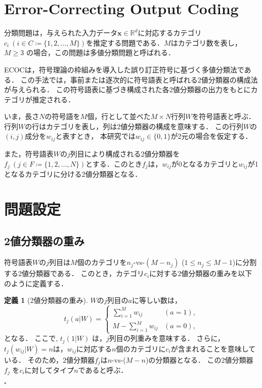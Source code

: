 \documentclass{jarticle}
\theoremstyle{definition}
\newtheorem{definition}{定義}
\def\QED{\hfill$\square$}
\begin{document}
\section{Error-Correcting Output Coding}
分類問題は，与えられた入力データ$\bm{x} \in \mathbb{R}^d$に対応するカテゴリ$c_i\ (i \in C \coloneqq \{1,2,\ldots,M\})$を推定する問題である．$M$はカテゴリ数を表し，$M \ge 3$ の場合，この問題は多値分類問題と呼ばれる．

ECOCは，符号理論の枠組みを導入した誤り訂正符号に基づく多値分類法\cite{Dietterich1994-mt}である．
この手法では，事前\cite{Rifkin2004-sk,Dietterich1994-mt,Escalera2010-pa}または逐次的\cite{Rocha2014-ey}に符号語表と呼ばれる2値分類器の構成法が与えられる．
この符号語表に基づき構成された各2値分類器の出力をもとにカテゴリが推定される．

いま，長さ$N$の符号語を$M$個，行として並べた$M\times N$行列$W$を符号語表と呼ぶ．
行列$W$の行はカテゴリを表し，列は2値分類器の構成を意味する．
この行列$W$の$ (i,j) $成分を$w_{ij}$と表すとき，
本研究では$w_{ij} \in \{0,1\}$が2元の場合を仮定する．

また，符号語表$W$の$j$列目により構成される2値分類器を$f_j\ (j \in F \coloneqq \{1,2,\ldots,N\})$とする．このとき$f_j$は，$w_{ij}$が0となるカテゴリと$w_{ij}$が1となるカテゴリに分ける2値分類器となる．

\section{問題設定}
\subsection{2値分類器の重み}
符号語表$W$の$j$列目は$M$個のカテゴリを$n_j$-vs-$(M-n_j)$ ($1\leq n_j\leq M - 1$)に分割する2値分類器である．
このとき，カテゴリ$c_i$に対する2値分類器の重みを以下のように定義する．
\begin{definition}[2値分類器の重み]\label{def:cate_weight}
$W$の$j$列目の$a$に等しい数は，
 \begin{equation}\label{eq:cate_weight}
    t_{j}(a|W) =\begin{cases}
    \sum_{i = 1}^M w_{ij}&(a = 1),\\
    M - \sum_{i = 1}^M w_{ij}&(a = 0),
  \end{cases}
\end{equation} 
となる．
ここで, $t_{j}(1|W)$ は，$j$列目の列重みを意味する．
さらに，$t_{j}(w_{ij}|W)=n$は，$w_{ij}$に対応する$n$個のカテゴリに$c_{i}$が含まれることを意味している．
そのため，2値分類器$f_j$は$n$-vs-($M - n$)の分類器となる．
この2値分類器 $f_j$ を$c_i$に対してタイプ$n$であると呼ぶ．

\QED
\end{definition}
\end{document}
